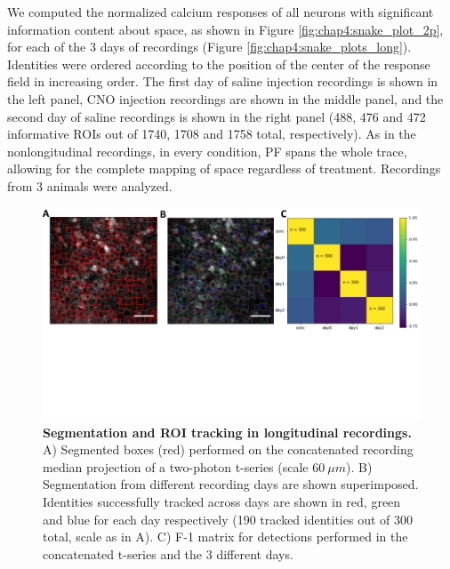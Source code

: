 We computed the normalized calcium responses of all neurons with significant information content about space, as shown in Figure \ref{fig:chap4:snake_plot_2p}, for each of the 3 days of recordings (Figure \ref{fig:chap4:snake_plots_long}). 
Identities were ordered according to the position of the center of the response field in increasing order.
The first day of saline injection recordings is shown in the left panel, CNO injection recordings are shown in the middle panel, and the second day of saline recordings is shown in the right panel (488, 476 and 472 informative  ROIs out of 1740, 1708 and 1758 total, respectively).
As in the nonlongitudinal recordings, in every condition, PF spans the whole trace, allowing for the complete mapping of space regardless of treatment.
Recordings from 3 animals were analyzed.
\begin{figure}
    \centering
    \includegraphics[trim={0 230 0 0},clip,width=\textwidth]{Figures/Chapter4/segmentation_long.pdf}
    \caption[Segmentation and ROI tracking in longitudinal recordings]{\textbf{Segmentation and ROI tracking in longitudinal recordings.} 
    A) Segmented boxes (red) performed on the concatenated recording median projection of a two-photon t-series (scale $60\ \mu m$). 
    B) Segmentation from different recording days are shown superimposed. Identities successfully tracked across days are shown in red, green and blue for each day respectively (190 tracked identities out of 300 total, scale as in A). 
    C) F-1 matrix for detections performed in the concatenated t-series and the 3 different days.}
    \label{fig:chap4:segmentation_long}
\end{figure}

